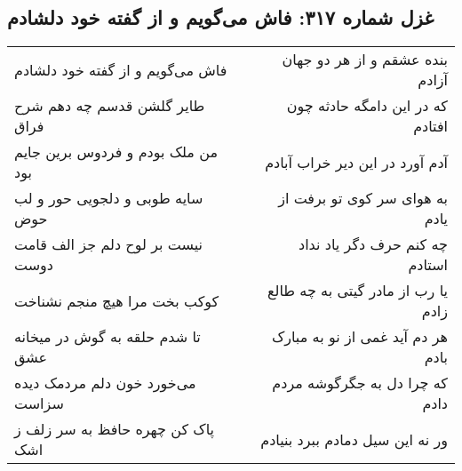 \begin{center}
\section*{غزل شماره ۳۱۷: فاش می‌گویم و از گفته خود دلشادم}
\label{sec:sh317}
\begin{longtable}{l p{0.5cm} r}
فاش می‌گویم و از گفته خود دلشادم
&&
بنده عشقم و از هر دو جهان آزادم
\\
طایر گلشن قدسم چه دهم شرح فراق
&&
که در این دامگه حادثه چون افتادم
\\
من ملک بودم و فردوس برین جایم بود
&&
آدم آورد در این دیر خراب آبادم
\\
سایه طوبی و دلجویی حور و لب حوض
&&
به هوای سر کوی تو برفت از یادم
\\
نیست بر لوح دلم جز الف قامت دوست
&&
چه کنم حرف دگر یاد نداد استادم
\\
کوکب بخت مرا هیچ منجم نشناخت
&&
یا رب از مادر گیتی به چه طالع زادم
\\
تا شدم حلقه به گوش در میخانه عشق
&&
هر دم آید غمی از نو به مبارک بادم
\\
می‌خورد خون دلم مردمک دیده سزاست
&&
که چرا دل به جگرگوشه مردم دادم
\\
پاک کن چهره حافظ به سر زلف ز اشک
&&
ور نه این سیل دمادم ببرد بنیادم
\\
\end{longtable}
\end{center}
